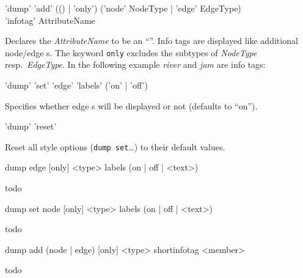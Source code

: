 \begin{rail}
  'dump' 'add' (() | 'only') ('node' NodeType | 'edge' EdgeType) \\ 'infotag' AttributeName
\end{rail}
Declares the  \emph{AttributeName} to be an ``''. Info tags are displayed like additional node/edge s. The keyword \texttt{only} excludes the subtypes of \emph{NodeType} resp.\ \emph{EdgeType}. In the following example \emph{river} and \emph{jam} are info tags:
\begin{center}
\end{center}


\begin{rail}
  'dump' 'set' 'edge' 'labels' ('on' | 'off')
\end{rail}
Specifies whether edge s will be displayed or not (defaults to ``on'').

\begin{rail}
  'dump' 'reset'
\end{rail}
Reset all style options (\texttt{dump set}\dots) to their default values.

\begin{grshelllet}
dump edge [only] <type> labels (on | off | <text>)
\end{grshelllet}
todo

\begin{grshelllet}
dump set node [only] <type> labels (on | off | <text>)
\end{grshelllet}
todo

\begin{grshelllet}
dump add (node | edge) [only] <type> shortinfotag <member>
\end{grshelllet}  
todo

